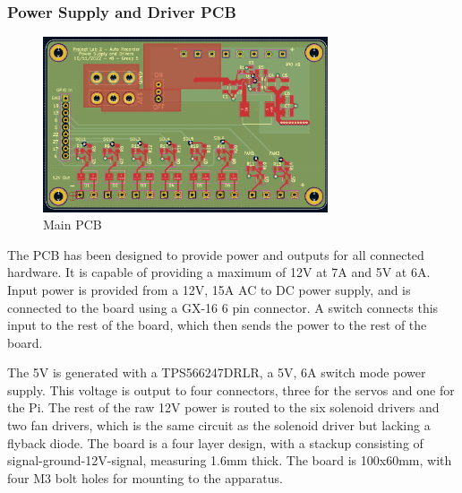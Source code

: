 \documentclass[UTF8, 12pt]{article}
\begin{document}
    \subsubsection{Power Supply and Driver PCB}
    \begin{figure}[h]
        \centering
        \includegraphics[width=0.75\textwidth]{pcb.png}
        \caption{Main PCB}
    \end{figure}
    The PCB has been designed to provide power and outputs for all connected hardware. It is capable of providing a maximum of 12V at 7A and 5V at 6A. Input power is provided from a 12V, 15A AC to DC power supply, and is connected to the board using a GX-16 6 pin connector. A switch connects this input to the rest of the board, which then sends the power to the rest of the board.

    The 5V is generated with a TPS566247DRLR, a 5V, 6A switch mode power supply. This voltage is output to four connectors, three for the servos and one for the Pi. The rest of the raw 12V power is routed to the six solenoid drivers and two fan drivers, which is the same circuit as the solenoid driver but lacking a flyback diode. The board is a four layer design, with a stackup consisting of signal-ground-12V-signal, measuring 1.6mm thick. The board is 100x60mm, with four M3 bolt holes for mounting to the apparatus. 
\end{document}
